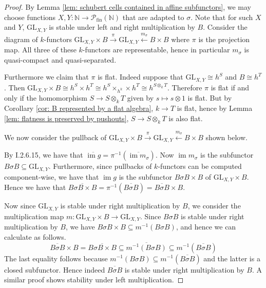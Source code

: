 \documentclass[oneside,11pt]{amsart}
\newcommand{\hilight}[1]{\colorbox{yellow}{#1}}
\newcommand{\nn}{\ensuremath{\mathbb{N}}}
\newcommand{\mP}{\ensuremath{\mathcal{P}}}
\newcommand{\GL}{\ensuremath{\text{GL}}}
\newcommand{\fin}{\ensuremath{\text{fin}}}
\newcommand{\im}{\operatorname{im}}
\theoremstyle{definition}
\newtheorem{proof techniques}{Proof Techniques}
\begin{document}
\begin{proof}
By Lemma \ref{lem: schubert cells contained in affine subfunctors}, we may choose functions $X , Y :\nn \to \mP_\fin(\nn)$ that are adapted to $\sigma$. Note that for such $X$ and $Y$, $\GL_{X , Y}$ is stable under left and right multiplication by $B$. Consider the diagram of $k$-functors $\GL_{X , Y} \times B \overset{\pi}{\longrightarrow} \GL_{X , Y} \overset{m_\sigma}{\longleftarrow} B \times B$ where $\pi$ is the projection map. All three of these $k$-functors are representable, hence in particular $m_\sigma$ is quasi-compact and quasi-separated. 

Furthermore we claim that $\pi$ is flat. Indeed suppose that  $\GL_{X , Y} \cong h^S$ and $B \cong h^T$. Then $\GL_{X , Y} \times B \cong h^S \times h^T \cong h^S \times_{h^k} \times h^T \cong h^{S \otimes_k T}$. Therefore $\pi$ is flat if and only if the homomorphism $S \to S \otimes_k T$ given by $s \mapsto s \otimes 1$ is flat. But by Corollary \ref{cor: B represented by a flat algebra}, $k \to T$ is flat, hence by Lemma \ref{lem: flatness is preserved by pushouts}, $S \to S \otimes_k T$ is also flat. 

We now consider the pullback of $\GL_{X , Y} \times B \overset{\pi}{\longrightarrow} \GL_{X , Y} \overset{m_\sigma}{\longleftarrow} B \times B$ shown below.

\begin{center}
\end{center}

By \cite{demazure-gabriel1980} I.2.6.15, we have that $\overline{\im g} = \pi^{-1}(\overline{\im m_\sigma})$. Now $\im m_\sigma$ is the subfunctor $B \sigma B \subseteq \GL_{X , Y}$. Furthermore, since pullbacks of $k$-functors can be computed component-wise, we have that $\im g$ is the subfunctor $B \sigma B \times B$ of $\GL_{X , Y} \times B$. Hence we have that $\overline{B \sigma B \times B} = \pi^{-1}(\overline{B \sigma B}) = \overline{B \sigma B} \times B$. 


Now since $\GL_{X , Y}$ is stable under right multiplication by $B$, we consider the multiplication map $m : \GL_{X , Y} \times B \to \GL_{X , Y}$. Since $B \sigma B$ is stable under right multiplication by $B$, we have $B \sigma B \times B \subseteq m^{-1}(B  \sigma B)$, and hence we can calculate as follows. 
\begin{equation*}
\overline{B \sigma B} \times B = \overline{B \sigma B \times B} \subseteq \overline{ m^{-1}(B  \sigma B) } \subseteq m^{-1}( \overline{B \sigma B} )
\end{equation*}
The last equality follows because $m^{-1}( B \sigma B) \subseteq m^{-1}(\overline{ B \sigma B })$ and the latter is a closed subfunctor. Hence indeed $\overline{B \sigma B}$ is stable under right multiplication by $B$. A similar proof shows stability under left multiplication. 
\end{proof}
\end{document}
